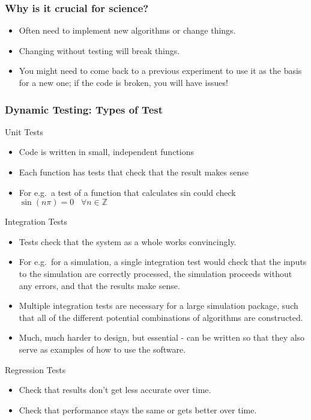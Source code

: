 \documentclass[ignorenonframetext,]{beamer}
\providecommand{\tightlist}{%
  \setlength{\itemsep}{0pt}\setlength{\parskip}{0pt}}
\begin{document}
\begin{frame}
\frametitle{Why is it crucial for science?}
\begin{itemize}
\tightlist
\item
  Often need to implement new algorithms or change things.
\item
  Changing without testing will break things.
\item
  You might need to come back to a previous experiment to use it as the
  basis for a new one; if the code is broken, you will have issues!
\end{itemize}
\end{frame}

\begin{frame}
\frametitle{Dynamic Testing: Types of Test}
\begin{block}{Unit Tests}
\begin{itemize}
\tightlist
\item
  Code is written in small, independent functions
\item
  Each function has tests that check that the result makes sense
\item
  For e.g.~a test of a function that calculates sin could check
  \(\sin{\left(n\pi\right)} = 0 \,\,\,\,\, \forall n \in \mathbb{Z}\)
\end{itemize}
\end{block}

\begin{block}{Integration Tests}
\begin{itemize}
\tightlist
\item
  Tests check that the system as a whole works convincingly.
\item For e.g.~for a simulation, a single integration test would check that
  the inputs to the simulation are correctly processed, the simulation
  proceeds without any errors, and that the results make sense.
\item Multiple integration tests are necessary for a large simulation
  package, such that all of the different potential combinations of
  algorithms are constructed.
\item Much, much harder to design, but essential - can be written so that
  they also serve as examples of how to use the software.
\end{itemize}
\end{block}

\begin{block}{Regression Tests}

\begin{itemize}
\tightlist
\item Check that results don't get less accurate over time.
\item Check that performance stays the same or gets better over time.
\end{itemize}

\end{block}

\end{frame}
\end{document}
